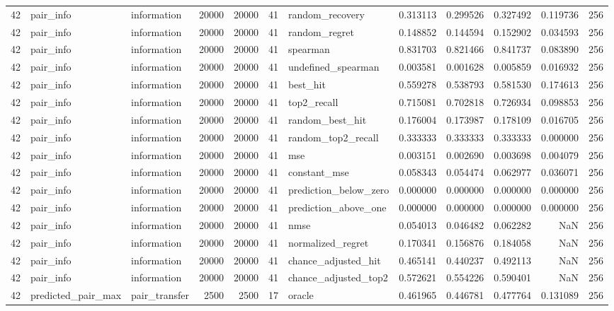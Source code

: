 \begin{tabular}{rllrrrlrrrrr}
42 & pair_info & information & 20000 & 20000 & 41 & random_recovery & 0.313113 & 0.299526 & 0.327492 & 0.119736 & 256 \\
42 & pair_info & information & 20000 & 20000 & 41 & random_regret & 0.148852 & 0.144594 & 0.152902 & 0.034593 & 256 \\
42 & pair_info & information & 20000 & 20000 & 41 & spearman & 0.831703 & 0.821466 & 0.841737 & 0.083890 & 256 \\
42 & pair_info & information & 20000 & 20000 & 41 & undefined_spearman & 0.003581 & 0.001628 & 0.005859 & 0.016932 & 256 \\
42 & pair_info & information & 20000 & 20000 & 41 & best_hit & 0.559278 & 0.538793 & 0.581530 & 0.174613 & 256 \\
42 & pair_info & information & 20000 & 20000 & 41 & top2_recall & 0.715081 & 0.702818 & 0.726934 & 0.098853 & 256 \\
42 & pair_info & information & 20000 & 20000 & 41 & random_best_hit & 0.176004 & 0.173987 & 0.178109 & 0.016705 & 256 \\
42 & pair_info & information & 20000 & 20000 & 41 & random_top2_recall & 0.333333 & 0.333333 & 0.333333 & 0.000000 & 256 \\
42 & pair_info & information & 20000 & 20000 & 41 & mse & 0.003151 & 0.002690 & 0.003698 & 0.004079 & 256 \\
42 & pair_info & information & 20000 & 20000 & 41 & constant_mse & 0.058343 & 0.054474 & 0.062977 & 0.036071 & 256 \\
42 & pair_info & information & 20000 & 20000 & 41 & prediction_below_zero & 0.000000 & 0.000000 & 0.000000 & 0.000000 & 256 \\
42 & pair_info & information & 20000 & 20000 & 41 & prediction_above_one & 0.000000 & 0.000000 & 0.000000 & 0.000000 & 256 \\
42 & pair_info & information & 20000 & 20000 & 41 & nmse & 0.054013 & 0.046482 & 0.062282 & NaN & 256 \\
42 & pair_info & information & 20000 & 20000 & 41 & normalized_regret & 0.170341 & 0.156876 & 0.184058 & NaN & 256 \\
42 & pair_info & information & 20000 & 20000 & 41 & chance_adjusted_hit & 0.465141 & 0.440237 & 0.492113 & NaN & 256 \\
42 & pair_info & information & 20000 & 20000 & 41 & chance_adjusted_top2 & 0.572621 & 0.554226 & 0.590401 & NaN & 256 \\
42 & predicted_pair_max & pair_transfer & 2500 & 2500 & 17 & oracle & 0.461965 & 0.446781 & 0.477764 & 0.131089 & 256 \\

\end{tabular}
